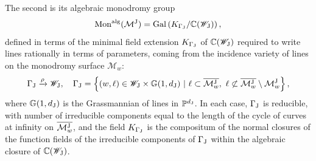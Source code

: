 \documentclass[a4paper,reqno]{amsart}
\numberwithin{equation}{section}
\newcommand{\C}{\mathbb{C}}
\newcommand{\p}{\mathbb{P}}
\numberwithin{equation}{section}
\begin{document}
The second is its algebraic monodromy group 
$$ \operatorname{Mon}^{\operatorname{alg}}(\mathcal{M}^{\rm{J}}) = \operatorname{Gal}\left(K_{\Gamma_{\rm{J}}}/ \C(\mathscr{W}_{\rm{J}})\right),$$
defined in terms of the minimal field extension $K_{\Gamma_{\rm{J}}}$ of $\C(\mathscr{W}_{\rm{J}})$ required to write lines rationally in terms of parameters, coming from the incidence variety of lines on the monodromy surface $\mathcal{M}_w$:
$$\Gamma_{\rm{J}} \xrightarrow{\rho} \mathscr{W}_{\rm{J}}, \quad \Gamma_{\rm{J}}  = \left\{ (w,\ell) \in \mathscr{W}_{\rm{J}}\times \mathbb{G}(1,d_{\rm{J}}) ~|~ \ell \subset \overline{\mathcal{M}_w^{\rm{J}}}, \,\, 
\ell\not\subset \overline{\mathcal{M}_w^{\rm{J}}}\setminus \mathcal{M}_w^{\rm{J}}\right\},$$
where $\mathbb{G}(1,d_{\rm{J}})$ is the Grassmannian of lines in $\p^{d_{\rm{J}}}$.
In each case, $\Gamma_{\rm{J}}$ is reducible, with number of irreducible components equal to the length of the cycle of curves at infinity on $\overline{\mathcal{M}^{\rm{J}}_w}$, and the  field $K_{\Gamma_{\rm{J}}}$ is the compositum of the normal closures of the function fields of the irreducible components of $\Gamma_{\rm{J}}$ within the algebraic closure of $\C(\mathscr{W}_{\rm{J}})$.
\end{document}
